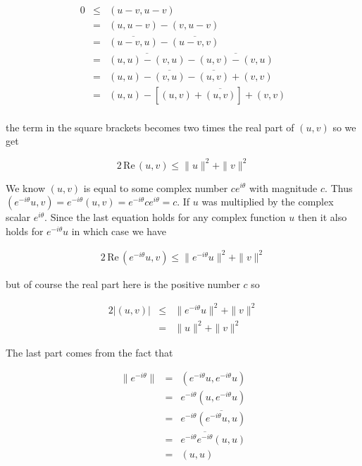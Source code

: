 \documentclass[oneside]{book}
\begin{document}
\begin{eqnarray}
0 &\le& (u-v,u-v)\nonumber\\
&=& (u,u-v)-(v,u-v)\nonumber\\
&=& \overline{(u-v,u)} - \overline{(u-v,v)}\nonumber\\
&=& \overline{(u,u)-(v,u)} - \overline{(u,v)-(v,u)}\nonumber\\
&=& (u,u)-\overline{(v,u)} - \overline{(u,v)}+(v,v)\nonumber\\
&=& (u,u)-[(u,v) + \overline{(u,v)}]+(v,v)\nonumber\\
\end{eqnarray}

the term in the square brackets becomes two times the real part of $(u,v)$ so we get

\begin{equation}
2\,\mathrm{Re}\,(u,v) \le \|u\|^2 + \|v\|^2 
\end{equation}

We know $(u,v)$  is equal to some complex number $ce^{i\theta}$ with magnitude $c$. Thus $(e^{-i\theta}u,v)=e^{-i\theta}(u,v)=e^{-i\theta}ce^{i\theta}=c$. If $u$ was multiplied by the complex scalar $e^{i\theta}$. Since the last equation holds for any complex function $u$ then it also holds for $e^{-i\theta}u$ in which case we have

\begin{eqnarray}
2\,\mathrm{Re}\,(e^{-i\theta}u,v) \le \|e^{-i\theta}u\|^2 + \|v\|^2 
\end{eqnarray}

but of course the real part here is the positive number $c$ so

\begin{eqnarray}
2 |(u,v)| &\le& \|e^{-i\theta}u\|^2 + \|v\|^2 \nonumber\\
&=& \|u\|^2 + \|v\|^2
\end{eqnarray}

The last part comes from the fact that

\begin{eqnarray}
\|e^{-i\theta}\| &=& (e^{-i\theta}u,e^{-i\theta}u) \nonumber\\
&=& e^{-i\theta} (u,e^{-i\theta}u)\nonumber\\
&=& e^{-i\theta} \overline{(e^{-i\theta}u,u)}\nonumber\\
&=& e^{-i\theta} \overline{e^{-i\theta}}(u,u)\nonumber\\
&=& (u,u)\nonumber\\
\end{eqnarray}
\end{document}
